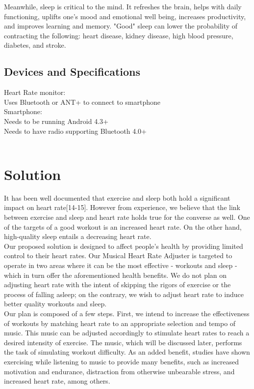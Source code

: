 \documentclass[letterpaper,english, 12pt]{scrreprt}
\begin{document}
Meanwhile, sleep is critical to the mind. It refreshes the brain, helps with daily functioning, uplifts one's mood and emotional well being, increases productivity, and improves learning and memory. "Good" sleep can lower the probability of contracting the following: heart disease, kidney disease, high blood pressure, diabetes, and stroke.\\
 
\subsection{Devices and Specifications}

Heart Rate monitor: \\
Uses Bluetooth or ANT+ to connect to smartphone \\

Smartphone: \\
Needs to be running Android 4.3+ \\
Needs to have radio supporting Bluetooth 4.0+  \\
\\

\section{Solution}
It has been well documented that exercise and sleep both hold a significant impact on heart rate[14-15]. However from experience, we believe that the link between exercise and sleep and heart rate holds true for the converse as well. One of the targets of a good workout is an increased heart rate. On the other hand, high-quality sleep entails a decreasing heart rate.\\
			 
Our proposed solution is designed to affect people's health by providing limited control to their heart rates. Our Musical Heart Rate Adjuster is targeted to operate in two areas where it can be the most effective - workouts and sleep - which in turn offer the aforementioned health benefits. We do not plan on adjusting heart rate with the intent of skipping the rigors of exercise or the process of falling asleep; on the contrary, we wish to adjust heart rate to induce better quality workouts and sleep.\\
			 
Our plan is composed of a few steps. First, we intend to increase the effectiveness of workouts by matching heart rate to an appropriate selection and tempo of music. This music can be adjusted accordingly to stimulate heart rates to reach a desired intensity of exercise. The music, which will be discussed later, performs the task of simulating workout difficulty. As an added benefit, studies have shown exercising while listening to music to provide many benefits, such as increased motivation and endurance, distraction from otherwise unbearable stress, and increased heart rate, among others.\\
			 
\end{document}

